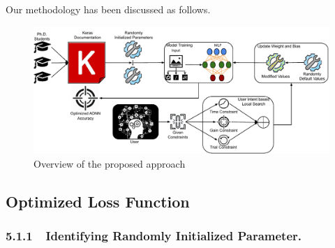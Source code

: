 Our methodology has been discussed as follows.
\begin{figure}
	\includegraphics[width=0.95\linewidth]{approach.pdf}
	\centering
	\caption{Overview of the proposed approach}
	\label{fig:flow}
	\vspace{15pt}
\end{figure}
\subsection{Optimized Loss Function}
\subsubsection{5.1.1~~Identifying Randomly Initialized Parameter.}

